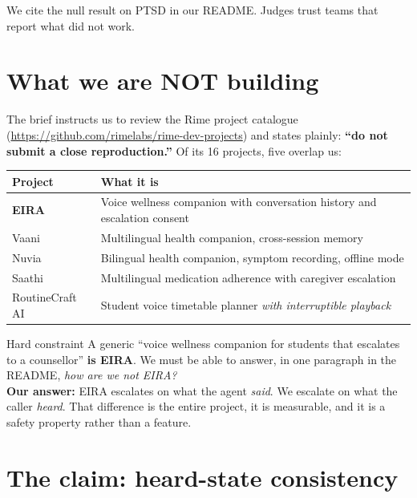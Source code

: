 \documentclass[11pt,a4paper]{article}
\begin{document}
\vspace{0.3em}
We cite the null result on PTSD in our README. Judges trust teams that report what
did not work.

\section{What we are NOT building}
\label{sec:delta}

The brief instructs us to review the Rime project catalogue
(\url{https://github.com/rimelabs/rime-dev-projects}) and states plainly:
\textbf{``do not submit a close reproduction.''} Of its 16 projects, five overlap us:

\begin{center}
\begin{tabular}{@{}lp{10.2cm}@{}}
\toprule
\textbf{Project} & \textbf{What it is} \\
\midrule
\textbf{EIRA} & Voice wellness companion with conversation history and escalation consent \\
Vaani & Multilingual health companion, cross-session memory \\
Nuvia & Bilingual health companion, symptom recording, offline mode \\
Saathi & Multilingual medication adherence with caregiver escalation \\
RoutineCraft AI & Student voice timetable planner \emph{with interruptible playback} \\
\bottomrule
\end{tabular}
\end{center}

\begin{keybox}{Hard constraint}
A generic ``voice wellness companion for students that escalates to a counsellor''
\textbf{is EIRA}. We must be able to answer, in one paragraph in the README,
\emph{how are we not EIRA?} \\[4pt]
\textbf{Our answer:} EIRA escalates on what the agent \emph{said}.
We escalate on what the caller \emph{heard}. That difference is the entire project,
it is measurable, and it is a safety property rather than a feature.
\end{keybox}

\section{The claim: heard-state consistency}
\label{sec:claim}
\end{document}
